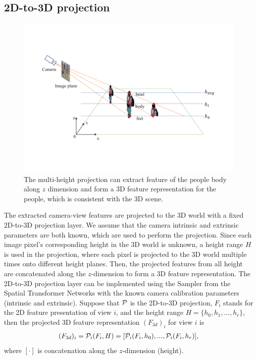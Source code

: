 \documentclass[letterpaper]{article} %
\newcommand{\zq}[1]{\textcolor{black}{#1}} %
\newcommand{\citep}{\cite}
\begin{document}
\subsection{2D-to-3D projection}


\begin{figure}[t]
\centering
   \includegraphics[width=0.95\columnwidth]{Fig_3dprojection.pdf}
   \caption{
   The multi-height projection can extract feature of the people body along $z$ dimension and form a 3D feature representation for the people, which is consistent with the 3D scene. }
\label{fig:3dprojection}
\end{figure}



\par
The extracted camera-view features are projected to the 3D world with a fixed 2D-to-3D projection layer. We assume that the camera intrinsic and extrinsic parameters are both known, which are used to perform the projection. Since each image pixel's corresponding height in the 3D world is unknown, a height range $H$
is used in the projection, where each pixel is projected to the 3D world multiple times onto different height planes. Then, the projected features from all height are concatenated along the $z$-dimension %
to form a 3D feature representation.
The 2D-to-3D projection layer can be implemented using the Sampler from the Spatial Transformer Networks \citep{Jaderberg2015Spatial} with the known camera calibration parameters (intrinsic and extrinsic).
Suppose that $\cal P$ is the 2D-to-3D projection, $F_i$ stands for the 2D feature presentation of view $i$, and the height range $H = \{h_0, h_1, ..., h_r\}$, then the projected 3D feature representation $(F_{3d})_i$ for view $i$ is
\begin{align}
  (F_{3d})_i = {{\cal P}_i} (F_i, H)
             = [{{\cal P}_i} (F_i, h_0), ..., {{\cal P}_i} (F_i, h_r)] ,
\end{align}
where $[\cdot]$ is concatenation %
along the $z$-dimension (height).
\end{document}
